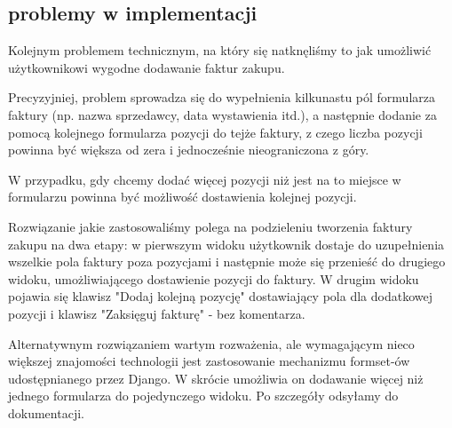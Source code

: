 \documentclass{beamer}
\begin{document}
\subsection{problemy w implementacji}
  \begin{frame}
    \begin{block}{}
      Kolejnym problemem technicznym, na który się natknęliśmy to jak umożliwić użytkownikowi wygodne dodawanie faktur zakupu.
    \end{block}
  \end{frame}
  \begin{frame}
    \begin{block}{}
      Precyzyjniej, problem sprowadza się do wypełnienia kilkunastu pól formularza faktury (np. nazwa sprzedawcy, data wystawienia itd.), a następnie dodanie za pomocą kolejnego formularza pozycji do tejże faktury, z czego liczba pozycji powinna być większa od zera i jednocześnie nieograniczona z góry.
    \end{block}
  \end{frame}
  \begin{frame}
    \begin{block}{}
      W przypadku, gdy chcemy dodać więcej pozycji niż jest na to miejsce w formularzu powinna być możliwość dostawienia kolejnej pozycji.
    \end{block}
  \end{frame}
  \begin{frame}
    \begin{block}{}
      Rozwiązanie jakie zastosowaliśmy polega na podzieleniu tworzenia faktury zakupu na dwa etapy: w pierwszym widoku użytkownik dostaje do uzupełnienia wszelkie pola faktury poza pozycjami i następnie może się przenieść do drugiego widoku, umożliwiającego dostawienie pozycji do faktury. W drugim widoku pojawia się klawisz "Dodaj kolejną pozycję" dostawiający pola dla dodatkowej pozycji i klawisz "Zaksięguj fakturę" - bez komentarza.
    \end{block}
  \end{frame}
  \begin{frame}
    \begin{block}{}
      Alternatywnym rozwiązaniem wartym rozważenia, ale wymagającym nieco większej znajomości technologii jest zastosowanie mechanizmu formset-ów udostępnianego przez Django. W skrócie umożliwia on dodawanie więcej niż jednego formularza do pojedynczego widoku. Po szczegóły odsyłamy do dokumentacji.
    \end{block}
  \end{frame}
\end{document}
